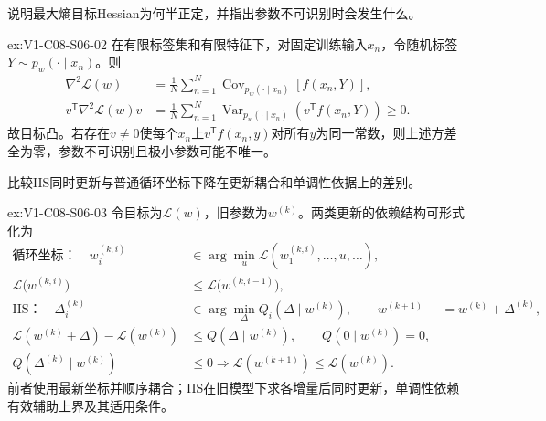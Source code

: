 \begin{SLChapterExercisePairSection}
\begin{exercise}\label{ex:V1-C08-S06-02}
说明最大熵目标Hessian为何半正定，并指出参数不可识别时会发生什么。
\end{exercise}
\label{sol:V1-C08-S06-02}
\begin{chapterexercisesolution}{ex:V1-C08-S06-02}
在有限标签集和有限特征下，对固定训练输入$x_n$，令随机标签$Y\sim p_w(\cdot\mid x_n)$。则
\[
\begin{aligned}
\nabla^2\mathcal L(w)
&=\frac1N\sum_{n=1}^N
\operatorname{Cov}_{p_w(\cdot\mid x_n)}[f(x_n,Y)],\\
v^{\mathsf T}\nabla^2\mathcal L(w)v
&=\frac1N\sum_{n=1}^N
\operatorname{Var}_{p_w(\cdot\mid x_n)}
\!\left(v^{\mathsf T}f(x_n,Y)\right)\ge0.
\end{aligned}
\]
故目标凸。若存在$v\ne0$使每个$x_n$上$v^{\mathsf T}f(x_n,y)$对所有$y$为同一常数，则上述方差全为零，参数不可识别且极小参数可能不唯一。
\end{chapterexercisesolution}

\begin{exercise}\label{ex:V1-C08-S06-03}
比较IIS同时更新与普通循环坐标下降在更新耦合和单调性依据上的差别。
\end{exercise}
\label{sol:V1-C08-S06-03}
\begin{chapterexercisesolution}{ex:V1-C08-S06-03}
令目标为$\mathcal L(w)$，旧参数为$w^{(k)}$。两类更新的依赖结构可形式化为
\[
\begin{aligned}
\text{循环坐标：}\quad
w_i^{(k,i)}
&\in\arg\min_u
\mathcal L(w_1^{(k,i)},\ldots,u,\ldots),\\
\mathcal L\bigl(w^{(k,i)}\bigr)
&\le \mathcal L\bigl(w^{(k,i-1)}\bigr),\\[2pt]
\text{IIS：}\quad
\Delta_i^{(k)}
&\in\arg\min_\Delta Q_i(\Delta\mid w^{(k)}),\qquad
w^{(k+1)}&=w^{(k)}+\Delta^{(k)},\\
\mathcal L(w^{(k)}+\Delta)-\mathcal L(w^{(k)})
&\le Q(\Delta\mid w^{(k)}),\qquad Q(0\mid w^{(k)})=0,\\
Q(\Delta^{(k)}\mid w^{(k)})&\le0
\Longrightarrow
\mathcal L(w^{(k+1)})\le\mathcal L(w^{(k)}).
\end{aligned}
\]
前者使用最新坐标并顺序耦合；IIS在旧模型下求各增量后同时更新，单调性依赖有效辅助上界及其适用条件。
\end{chapterexercisesolution}

\end{SLChapterExercisePairSection}

